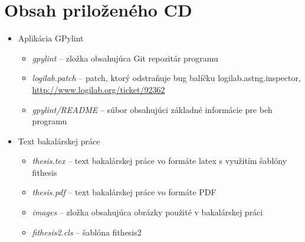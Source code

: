 \documentclass[11pt,oneside,final]{fithesis2}
\begin{document}
\chapter{Obsah priloženého CD}

\begin{itemize}
\item Aplikácia GPylint

	\begin{itemize}
	 \item \emph{gpylint} -- zložka obsahujúca Git repozitár programu
	 \item \emph{logilab.patch} -- patch, ktorý odstraňuje bug balíčku logilab.astng.inspector, \url{http://www.logilab.org/ticket/92362}
	 \item \emph{gpylint/README} -- súbor obsahujúci základné informácie pre beh programu
	\end{itemize}



\item Text bakalárskej práce

	\begin{itemize}
	 \item \emph{thesis.tex} -- text bakalárskej práce vo formáte latex s využitím šablóny fithesis
	 \item \emph{thesis.pdf} -- text bakalárskej práce vo formáte PDF
	 \item \emph{images} -- zložka obsahujúca obrázky použité v bakalárskej práci
	 \item \emph{fithesis2.cls} -- šablóna fithesis2
	\end{itemize}
	
\end{itemize}
\end{document}
